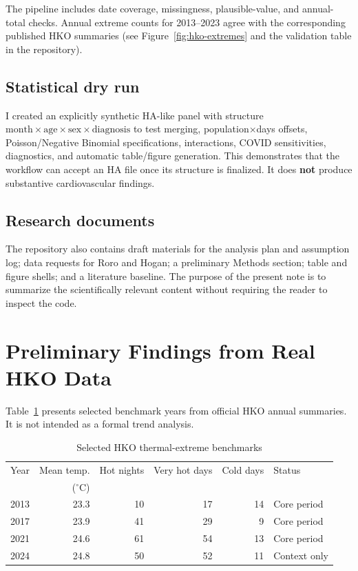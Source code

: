 \documentclass[11pt]{article}
\begin{document}
The pipeline includes date coverage, missingness, plausible-value, and
annual-total checks. Annual extreme counts for 2013--2023 agree with the
corresponding published HKO summaries (see Figure~\ref{fig:hko-extremes} and
the validation table in the repository).

\subsection{Statistical dry run}

I created an explicitly synthetic HA-like panel with structure
$\mathrm{month}\times\mathrm{age}\times\mathrm{sex}\times\mathrm{diagnosis}$
to test merging, population$\times$days offsets, Poisson/Negative Binomial
specifications, interactions, COVID sensitivities, diagnostics, and automatic
table/figure generation. This demonstrates that the workflow can accept an HA
file once its structure is finalized. It does \textbf{not} produce substantive
cardiovascular findings.

\subsection{Research documents}

The repository also contains draft materials for the analysis plan and
assumption log; data requests for Roro and Hogan; a preliminary Methods
section; table and figure shells; and a literature baseline. The purpose of
the present note is to summarize the scientifically relevant content without
requiring the reader to inspect the code.

\section{Preliminary Findings from Real HKO Data}

Table~\ref{tab:hko} presents selected benchmark years from official HKO annual
summaries. It is not intended as a formal trend analysis.

\begin{table}[ht]
\centering
\caption{Selected HKO thermal-extreme benchmarks}
\label{tab:hko}
\small
\begin{tabular}{lrrrrl}
\toprule
Year & Mean temp. & Hot nights & Very hot days & Cold days & Status\\
     & ($^\circ$C) & & & &\\
\midrule
2013 & 23.3 & 10 & 17 & 14 & Core period\\
2017 & 23.9 & 41 & 29 & 9  & Core period\\
2021 & 24.6 & 61 & 54 & 13 & Core period\\
2024 & 24.8 & 50 & 52 & 11 & Context only\\
\bottomrule
\end{tabular}
\end{table}
\end{document}
